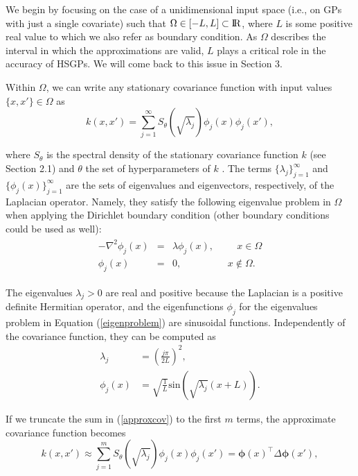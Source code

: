 \documentclass[]{interact}
\theoremstyle{plain}%
\theoremstyle{definition}
\theoremstyle{remark}
\begin{document}
We begin by focusing on the case of a unidimensional input space (i.e., on GPs with just a single covariate) such that $\Omega \in [-L,L] \subset {\rm I\!R}$, where $L$ is some positive real value to which we also refer as boundary condition. As $\Omega$ describes the interval in which the approximations are valid, $L$ plays a critical role in the accuracy of HSGPs. We will come back to this issue in Section 3.

Within $\Omega$, we can write any stationary covariance function with input values $\{x,x'\} \in \Omega$ as 
%
\begin{equation}\label{approxcov}
k(x,x') = \sum_{j=1}^\infty S_{\theta}(\sqrt{\lambda_j}) \phi_j(x) \phi_j(x'),
\end{equation} 

\noindent where $S_{\theta}$ is the spectral density of the stationary covariance function $k$ (see Section 2.1) and $\theta$ the set of hyperparameters of $k$ \citep{rasmussen2006gaussian}. The terms $\{\lambda_j\}_{j=1}^{\infty}$ and $\{\phi_j(x)\}_{j=1}^{\infty}$ are the sets of eigenvalues and eigenvectors, respectively, of the Laplacian operator. Namely, they satisfy the following eigenvalue problem in $\Omega$ when applying the Dirichlet boundary condition (other boundary conditions could be used as well):
%
\begin{eqnarray}\label{eigenproblem}
\begin{split}
-\nabla^2 \phi_j(x)&=&\lambda \phi_j(x), \hspace{1cm}  x \in \Omega \\ 
\phi_j(x)&=&0, \hspace{2cm} x \notin \Omega.
\end{split}
\end{eqnarray} 

\noindent The eigenvalues $\lambda_j>0$ are real and positive because the Laplacian is a positive definite Hermitian operator, and the eigenfunctions $\phi_j$ for the eigenvalues problem in Equation (\ref{eigenproblem}) are sinusoidal functions. Independently of the covariance function, they can be computed as
%
\begin{align}
\lambda_j&=\left(\frac{j\pi}{2L}\right)^2, \label{eigenvalue}\\
\phi_j(x)&=\sqrt{\frac{1}{L}} \text{sin}\left(\sqrt{\lambda_j}(x+L)\right). \label{eigenfunction}
\end{align}

If we truncate the sum in (\ref{approxcov}) to the first $m$ terms, the approximate covariance function becomes
%
\begin{equation}
k(x,x') \approx \sum_{j=1}^m S_{\theta}(\sqrt{\lambda_j}) \phi_j(x) \phi_j(x') = \boldsymbol{\phi}(x)^\intercal \Delta \boldsymbol{\phi}(x'), \nonumber
\end{equation}
\end{document}

